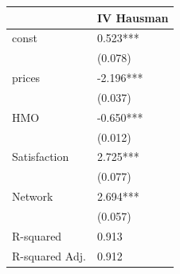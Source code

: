 \begin{tabular}{ll}
\hline
               & IV Hausman  \\
\hline
const          & 0.523***    \\
               & (0.078)     \\
prices         & -2.196***   \\
               & (0.037)     \\
HMO            & -0.650***   \\
               & (0.012)     \\
Satisfaction   & 2.725***    \\
               & (0.077)     \\
Network        & 2.694***    \\
               & (0.057)     \\
R-squared      & 0.913       \\
R-squared Adj. & 0.912       \\
\hline
\end{tabular}